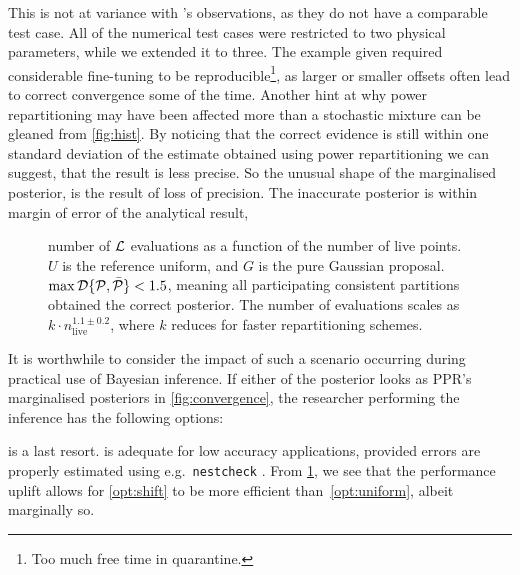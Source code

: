 \documentclass[usenatbib]{mnras}
\begin{document}
This is not at variance with \cite{chen-ferroz-hobson}'s observations,
as they do not have a comparable test case. All of the numerical test
cases were restricted to two physical parameters, while we extended it
to three. The example given required considerable fine-tuning to be
reproducible\footnote{Too much free time in quarantine. }, as larger
or smaller offsets often lead to correct convergence some of the
time. Another hint at why power repartitioning may have been affected
more than a stochastic mixture can be gleaned from \cref{fig:hist}. By
noticing that the correct evidence is still within one standard
deviation of the estimate obtained using power repartitioning we can
suggest, that the result is less precise. So the unusual shape of the
marginalised posterior, is the result of loss of precision. The
inaccurate posterior is within margin of error of the analytical
result, 


\begin{figure}
  
  \caption{number of ${\cal L}$ evaluations as a function of the
    number of live points. \(U\) is the reference uniform, and \(G\)
    is the pure Gaussian proposal.
    \(\max {\cal D}\{{\cal P}, \bar{\cal P}\} < 1.5\), meaning all
    participating consistent partitions obtained the correct
    posterior. The number of evaluations scales as
    $k\cdot n_\text{live}^{1.1 \pm 0.2}$, where $k$ reduces for faster
    repartitioning schemes. \label{fig:benchmark}}
\end{figure}


It is worthwhile to consider the impact of such a scenario occurring
during practical use of Bayesian inference. If either of the posterior
looks as PPR's marginalised posteriors in \cref{fig:convergence}, the
researcher performing the inference has the following options:
 is a last resort.  is
adequate for low accuracy applications, provided errors are properly
estimated using e.g.~\texttt{nestcheck} \citep{higson2018nestcheck}.
From \cref{fig:benchmark}, we see that the performance uplift allows
for \cref{opt:shift} to be more efficient than~\ref{opt:uniform},
albeit marginally so.
\end{document}
